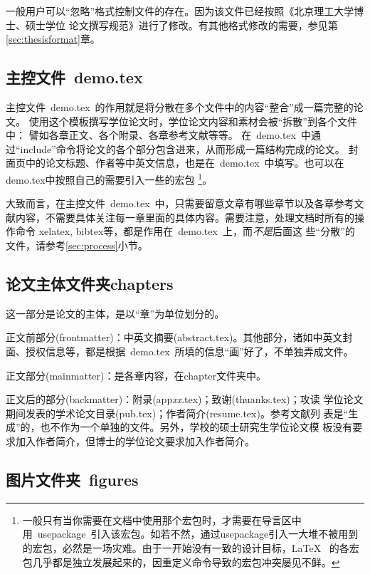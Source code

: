 一般用户可以``忽略''格式控制文件的存在。因为该文件已经按照《北京理工大学博士、硕士学位
论文撰写规范》进行了修改。有其他格式修改的需要，参见第\ref{sec:thesisformat}章。


\subsection{主控文件~demo.tex}
\label{sec:demotex}

主控文件~demo.tex~的作用就是将分散在多个文件中的内容``整合''成一篇完整的论文。
使用这个模板撰写学位论文时，学位论文内容和素材会被``拆散''到各个文件中：
譬如各章正文、各个附录、各章参考文献等等。
在~demo.tex~中通过``include''命令将论文的各个部分包含进来，从而形成一篇结构完成的论文。
封面页中的论文标题、作者等中英文信息，也是在~demo.tex~中填写。也可以在demo.tex中按照自己的需要引入一些的宏包
\footnote{一般只有当你需要在文档中使用那个宏包时，才需要在导言区中用~usepackage~引入该宏包。如若不然，通过usepackage引入一大堆不被用到的宏包，必然是一场灾难。由于一开始没有一致的设计目标，\LaTeX~ 的各宏包几乎都是独立发展起来的，因重定义命令导致的宏包冲突屡见不鲜。}。

大致而言，在主控文件~demo.tex~中，只需要留意文章有哪些章节以及各章参考文
献内容，不需要具体关注每一章里面的具体内容。需要注意，处理文档时所有的操作命令
{}\cndash{}xelatex, bibtex等，都是作用在~demo.tex~上，而\emph{不是}后面这
些``分散''的文件，请参考\ref{sec:process}小节。


\subsection{论文主体文件夹chapters}
\label{sec:thesisbody}

这一部分是论文的主体，是以``章''为单位划分的。

正文前部分(frontmatter)：中英文摘要(abstract.tex)。其他部分，诸如中英文封
面、授权信息等，都是根据~demo.tex~所填的信息``画''好了，不单独弄成文件。

正文部分(mainmatter)：是各章内容，在chapter文件夹中。

正文后的部分(backmatter)：附录(app\emph{xx}.tex)；致谢(thuanks.tex)；攻读
学位论文期间发表的学术论文目录(pub.tex)；作者简介(resume.tex)。参考文献列
表是``生成''的，也不作为一个单独的文件。另外，学校的硕士研究生学位论文模
板没有要求加入作者简介，但博士的学位论文要求加入作者简介。


\subsection{图片文件夹~figures}
\label{sec:figuresdir}

